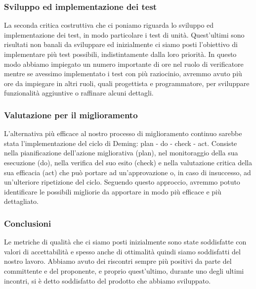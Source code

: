 \subsubsection{Sviluppo ed implementazione dei test}
La seconda critica costruttiva che ci poniamo riguarda lo sviluppo ed implementazione dei test, in modo particolare i test di unità. Quest'ultimi sono risultati non banali da sviluppare ed inizialmente ci siamo posti l’obiettivo di implementare più test possibili, indistintamente dalla loro priorità. In questo modo abbiamo impiegato un numero importante di ore nel ruolo di verificatore mentre se avessimo implementato i test con più raziocinio, avremmo avuto più ore da impiegare in altri ruoli, quali progettista e programmatore, per sviluppare funzionalità aggiuntive o raffinare alcuni dettagli.

\subsubsection{Valutazione per il miglioramento}
L'alternativa più efficace al nostro processo di miglioramento continuo sarebbe stata l’implementazione del ciclo di Deming: plan - do - check - act. Consiste nella
pianificazione dell’azione migliorativa (plan), nel monitoraggio della sua esecuzione
(do), nella verifica del suo esito (check) e nella valutazione critica
della sua efficacia (act) che può portare ad un’approvazione o, in caso di
insuccesso, ad un’ulteriore ripetizione del ciclo. Seguendo questo approccio,
avremmo potuto identificare le possibili migliorie da apportare in modo più
efficace e più dettagliato.

\subsubsection{Conclusioni}
Le metriche di qualità che ci siamo posti inizialmente sono state soddisfatte
con valori di accettabilità e spesso anche di ottimalità quindi siamo soddisfatti del nostro lavoro. Abbiamo avuto dei riscontri sempre più positivi da parte del committente e del proponente, e proprio quest’ultimo, durante uno degli ultimi incontri, si è detto soddisfatto del prodotto che abbiamo sviluppato.